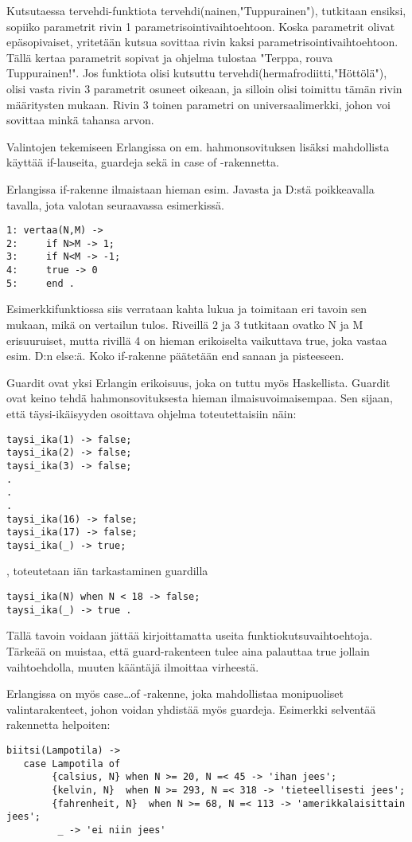 \documentclass[11pt,oneside,a4paper]{article}
\begin{document}
Kutsutaessa tervehdi-funktiota tervehdi(nainen,"Tuppurainen"), tutkitaan
ensiksi, sopiiko parametrit  rivin 1 parametrisointivaihtoehtoon. Koska
parametrit olivat epäsopivaiset, 
yritetään kutsua sovittaa rivin kaksi parametrisointivaihtoehtoon. Tällä kertaa
parametrit sopivat ja ohjelma tulostaa "Terppa, rouva Tuppurainen!". Jos
funktiota olisi kutsuttu
tervehdi(hermafrodiitti,"Höttölä"), olisi vasta rivin 3 parametrit osuneet
oikeaan, ja silloin olisi toimittu tämän rivin määritysten mukaan. 
Rivin 3 toinen parametri on universaalimerkki, 
johon voi sovittaa minkä tahansa arvon.

Valintojen tekemiseen Erlangissa on em. hahmonsovituksen lisäksi mahdollista
käyttää if-lauseita, guardeja sekä in case of -rakennetta.

Erlangissa if-rakenne ilmaistaan hieman esim. Javasta ja D:stä poikkeavalla
tavalla, jota valotan seuraavassa esimerkissä. 

\begin{verbatim}
1: vertaa(N,M) -> 
2:     if N>M -> 1;
3:     if N<M -> -1;
4:     true -> 0
5:     end . 
\end{verbatim}

Esimerkkifunktiossa siis verrataan kahta lukua ja toimitaan eri tavoin sen
mukaan, mikä on vertailun tulos. Riveillä 2 ja 3 tutkitaan ovatko N ja M
erisuuruiset, mutta rivillä 4 on hieman erikoiselta
vaikuttava true, joka vastaa esim. D:n else:ä. Koko if-rakenne päätetään end
sanaan ja pisteeseen. 

Guardit ovat yksi Erlangin erikoisuus, joka on tuttu myös Haskellista. Guardit
ovat keino tehdä hahmonsovituksesta hieman ilmaisuvoimaisempaa. Sen sijaan, että
täysi-ikäisyyden osoittava ohjelma 
toteutettaisiin näin: 
\begin{verbatim}
taysi_ika(1) -> false;
taysi_ika(2) -> false;
taysi_ika(3) -> false;
.
.
.
taysi_ika(16) -> false;
taysi_ika(17) -> false;
taysi_ika(_) -> true;
\end{verbatim}
, toteutetaan iän tarkastaminen guardilla
\begin{verbatim}
taysi_ika(N) when N < 18 -> false;
taysi_ika(_) -> true . 
\end{verbatim}

Tällä tavoin voidaan jättää kirjoittamatta useita funktiokutsuvaihtoehtoja. 
Tärkeää on muistaa, että guard-rakenteen tulee aina palauttaa true jollain
vaihtoehdolla, muuten kääntäjä ilmoittaa virheestä.  

Erlangissa on myös case…of -rakenne, joka mahdollistaa monipuoliset
valintarakenteet, johon voidan yhdistää myös guardeja. Esimerkki selventää
rakennetta helpoiten:
\begin{verbatim}
biitsi(Lampotila) -> 
   case Lampotila of
        {calsius, N} when N >= 20, N =< 45 -> 'ihan jees';
        {kelvin, N}  when N >= 293, N =< 318 -> 'tieteellisesti jees';  
        {fahrenheit, N}  when N >= 68, N =< 113 -> 'amerikkalaisittain jees'; 
         _ -> 'ei niin jees' 
\end{verbatim}
\end{document}
